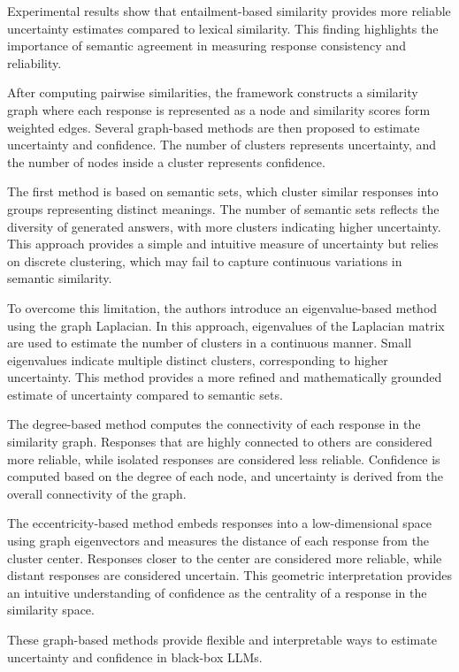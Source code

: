 Experimental results show that entailment-based similarity provides more reliable uncertainty estimates compared to lexical similarity. This finding highlights the importance of semantic agreement in measuring response consistency and reliability.


After computing pairwise similarities, the framework constructs a similarity graph where each response is represented as a node and similarity scores form weighted edges. Several graph-based methods are then proposed to estimate uncertainty and confidence. The number of clusters represents uncertainty, and the number of nodes inside a cluster represents confidence.

The first method is based on semantic sets, which cluster similar responses into groups representing distinct meanings. The number of semantic sets reflects the diversity of generated answers, with more clusters indicating higher uncertainty. This approach provides a simple and intuitive measure of uncertainty but relies on discrete clustering, which may fail to capture continuous variations in semantic similarity.

To overcome this limitation, the authors introduce an eigenvalue-based method using the graph Laplacian. In this approach, eigenvalues of the Laplacian matrix are used to estimate the number of clusters in a continuous manner. Small eigenvalues indicate multiple distinct clusters, corresponding to higher uncertainty. This method provides a more refined and mathematically grounded estimate of uncertainty compared to semantic sets.

The degree-based method computes the connectivity of each response in the similarity graph. Responses that are highly connected to others are considered more reliable, while isolated responses are considered less reliable. Confidence is computed based on the degree of each node, and uncertainty is derived from the overall connectivity of the graph.

The eccentricity-based method embeds responses into a low-dimensional space using graph eigenvectors and measures the distance of each response from the cluster center. Responses closer to the center are considered more reliable, while distant responses are considered uncertain. This geometric interpretation provides an intuitive understanding of confidence as the centrality of a response in the similarity space.

These graph-based methods provide flexible and interpretable ways to estimate uncertainty and confidence in black-box LLMs.


